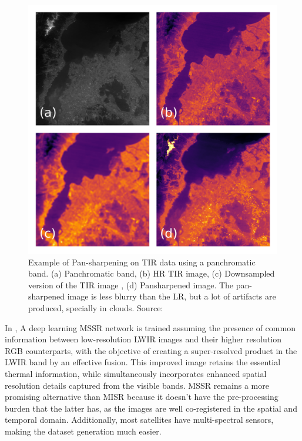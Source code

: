         \begin{figure}[H]
            \centering
            \includegraphics[width=\textwidth]{Includes/2-pansharpen.png}
            \caption{Example of Pan-sharpening on TIR data using a panchromatic band. (a) Panchromatic band, (b) HR TIR image, (c) Downsampled version of the TIR image , (d) Pansharpened image. 
            The pan-sharpened image is less blurry than the LR, but a lot of artifacts are produced, specially in clouds. Source: \cite{myself2023}}
            \label{fig:2-pansharpening}
        \end{figure}

        In \cite{myself2023}, A deep learning MSSR network is trained assuming the presence of common information between low-resolution LWIR images and their higher resolution RGB counterparts, with the objective of creating a super-resolved product in the LWIR band by an effective fusion. This improved image retains the essential thermal information, while simultaneously incorporates enhanced spatial resolution details captured from the visible bands. 
        MSSR remains a more promising alternative than MISR because it doesn't have the pre-processing burden that the latter has, as the images are well co-registered in the spatial and temporal domain.
        Additionally, most satellites have multi-spectral sensors, making the dataset generation much easier.

